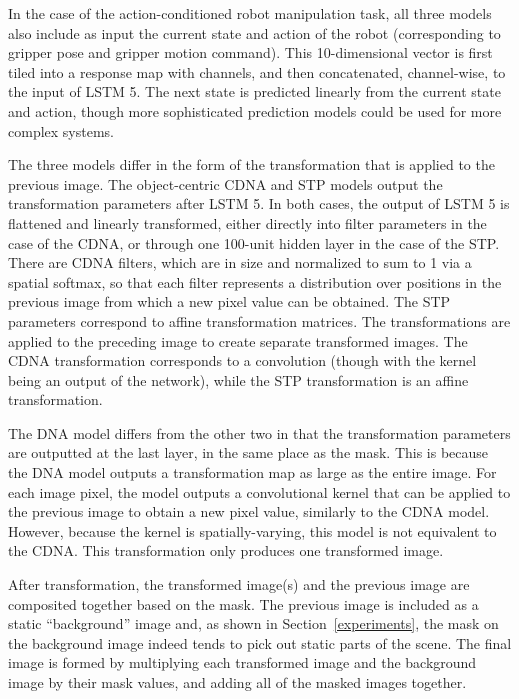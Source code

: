 \documentclass{article}
\begin{document}
In the case of the action-conditioned robot manipulation task, all three models also include as input the current state and action of the robot
(corresponding to gripper pose and gripper motion command).
This 10-dimensional vector is first tiled into a  response map with  channels, and then concatenated, channel-wise, to the input of LSTM 5.
The next state is predicted linearly from the current state and action, though more sophisticated prediction models could be used for more complex systems.

The three models differ in the form of the transformation that is applied to the previous image.
The object-centric CDNA and STP models output the transformation parameters after LSTM 5.
In both cases, the output of LSTM 5 is flattened and linearly transformed, either directly into filter parameters in the case of the CDNA, or through one 100-unit hidden layer in the case of the STP.
There are  CDNA filters, which are  in size and normalized to sum to 1 via a spatial softmax,
so that each filter represents a distribution over positions in the previous image from which a new pixel value can be obtained.
The STP parameters correspond to   affine transformation matrices. The transformations are applied to the preceding image to create
 separate transformed images. The CDNA transformation corresponds to a convolution (though with the kernel being an output of the network),
while the STP transformation is an affine transformation.

The DNA model differs from the other two in that the transformation parameters are outputted at the last layer, in the same place as the mask.
This is because the DNA model outputs a transformation map as large as the entire image. For each image pixel, the model outputs a
 convolutional kernel that can be applied to the previous image to obtain a new pixel value, similarly to the CDNA model.
However, because the kernel is spatially-varying, this model is not equivalent to the CDNA. This transformation only produces one transformed image.

After transformation, the transformed image(s) and the previous image are composited together based on the mask.
The previous image is included as a static ``background'' image and, as shown in Section~\ref{experiments}, the mask on the background image indeed tends to pick out static parts of the scene.
The final image is formed by multiplying each transformed image and the background image by their mask values, and adding all of the masked images together.
\end{document}
